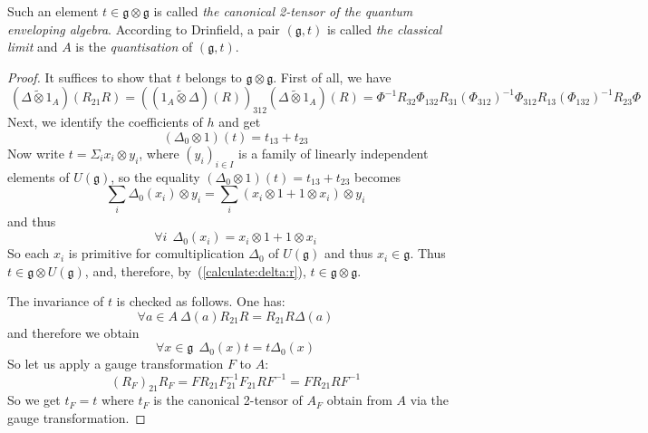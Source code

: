 \documentclass[8pt]{article}
\theoremstyle{definition}
\theoremstyle{definition}
\theoremstyle{definition}
\theoremstyle{definition}
\theoremstyle{definition}
\theoremstyle{definition}
\theoremstyle{definition}
\theoremstyle{definition}
\theoremstyle{definition}
\theoremstyle{definition}
\theoremstyle{definition}
\theoremstyle{definition}
\theoremstyle{definition}
\theoremstyle{definition}
\theoremstyle{question}
\newcommand{\tildetimes}[0]{\widetilde{\otimes}}
\begin{document}
Such an element $t \in \mathfrak{g} \otimes \mathfrak{g}$ is called \emph{the canonical 2-tensor of the quantum enveloping algebra}.
According to Drinfield, a pair $(\mathfrak{g}, t)$ is called \emph{the classical limit} and $A$ is the 
\emph{quantisation} of $(\mathfrak{g}, t)$.

\begin{proof}
  It suffices to show that $t$ belongs to $\mathfrak{g} \otimes \mathfrak{g}$. First of all, we have
  \begin{equation}~\label{calculate:delta:r}
    (\Delta \tildetimes 1_A)(R_{21} R) = ((1_A \tildetimes \Delta)(R))_{312} (\Delta \tildetimes 1_A)(R) = \Phi^{-1} R_{32} \Phi_{132} R_{31} (\Phi_{312})^{-1} \Phi_{312} R_{13} (\Phi_{132})^{-1} R_{23} \Phi
  \end{equation}
  Next, we identify the coefficients of $h$ and get 
  \[
  (\Delta_0 \otimes 1)(t) = t_{13} + t_{23}
  \]
  Now write $t = \Sigma_i x_i \otimes y_i$, where $(y_i)_{i \in I}$ is a family of linearly independent elements of 
  $U(\mathfrak{g})$, so the equality $(\Delta_0 \otimes 1)(t) = t_{13} + t_{23}$ becomes
  \[
  \sum \limits_{i} \Delta_0(x_i) \otimes y_i = \sum \limits_{i} (x_i \otimes 1 + 1 \otimes x_i) \otimes y_i
  \]
  and thus
  \[
  \forall i \:\:  \Delta_0(x_i) = x_i \otimes 1 + 1 \otimes x_i
  \]
  So each $x_i$ is primitive for comultiplication $\Delta_0$ of $U(\mathfrak{g})$ and thus $x_i \in \mathfrak{g}$.
  Thus $t \in \mathfrak{g} \otimes U(\mathfrak{g})$, and, therefore, by~(\ref{calculate:delta:r}), $t \in \mathfrak{g} \otimes \mathfrak{g}$.

  The invariance of $t$ is checked as follows. One has:
  \[
  \forall a \in A \: \Delta(a) R_{21} R = R_{21} R \Delta(a)
  \]
  and therefore we obtain
  \[
  \forall x \in \mathfrak{g} \:\: \Delta_0 (x) t = t \Delta_0(x)
  \]
  So let us apply a gauge transformation $F$ to $A$:
  \[
  (R_F)_{21} R_F = F R_{21} F_{21}^{-1} F_{21} R F^{-1} = F R_{21} R F^{-1}
  \]
  So we get $t_F = t$ where $t_F$ is the canonical 2-tensor of $A_F$ obtain from $A$ via the gauge transformation.
\end{proof}
\end{document}
